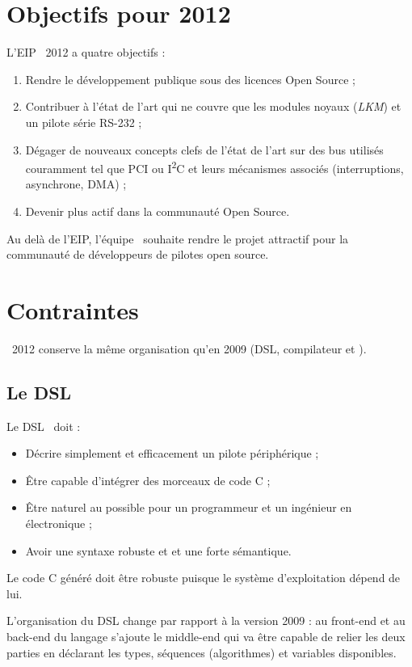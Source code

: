 \documentclass{rtxreport}
\begin{document}
\chapter{Objectifs pour 2012}

L'EIP \rtx\ 2012 a quatre objectifs :
\begin{enumerate}
\item Rendre le développement publique sous des licences Open Source ;
\item Contribuer à l'état de l'art qui ne couvre que les modules noyaux
(\emph{LKM}) et un pilote série RS-232 ;
\item Dégager de nouveaux concepts clefs de l'état de l'art sur
des bus utilisés couramment tel que PCI ou I\textsuperscript{2}C et leurs
mécanismes associés (interruptions, asynchrone, DMA) ;
\item Devenir plus actif dans la communauté Open Source.
\end{enumerate}

Au delà de l'EIP, l'équipe \rtx\ souhaite rendre le projet attractif pour la
communauté de développeurs de pilotes open source.

\chapter{Contraintes}

\rtx\ 2012 conserve la même organisation qu'en 2009 (DSL, compilateur et \BL).

\section{Le DSL}

Le DSL \rtx\ doit :
\begin{itemize}
\item Décrire simplement et efficacement un pilote périphérique ;
\item Être capable d'intégrer des morceaux de code C ;
\item Être naturel au possible pour un programmeur et un ingénieur en
électronique ;
\item Avoir une syntaxe robuste et et une forte sémantique.
\end{itemize}

Le code C généré doit être robuste puisque le système d'exploitation dépend de lui.

L'organisation du DSL change par rapport à la version 2009 : au front-end et au
back-end du langage s'ajoute le middle-end qui va être capable de relier les
deux parties en déclarant les types, séquences (algorithmes) et variables
disponibles.
\end{document}
